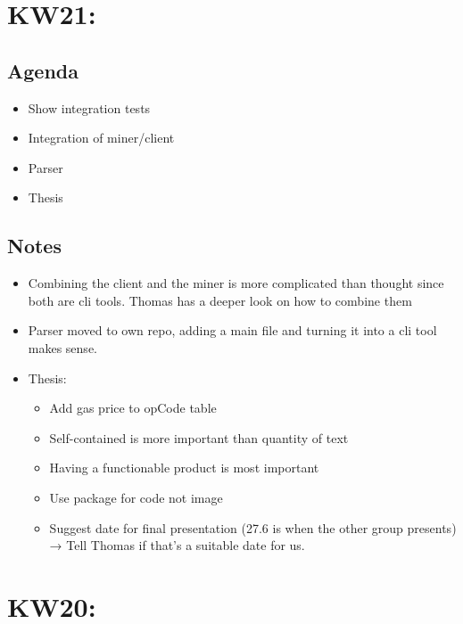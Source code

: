\section{KW21:}
\subsection{Agenda}
\begin{itemize}
\item
  Show integration tests
\item
  Integration of miner/client
\item
  Parser
\item
  Thesis
\end{itemize}

\subsection{Notes}
\begin{itemize}
\item
  Combining the client and the miner is more complicated than thought
  since both are cli tools. Thomas has a deeper look on how to combine
  them
\item
  Parser moved to own repo, adding a main file and turning it into a cli
  tool makes sense.
\item
  Thesis:
  \begin{itemize}
  \item
    Add gas price to opCode table
  \item
    Self-contained is more important than quantity of text
  \item
    Having a functionable product is most important
  \item
    Use package for code not image
  \item
    Suggest date for final presentation (27.6 is when the other group
    presents) → Tell Thomas if that's a suitable date for us.
  \end{itemize}
\end{itemize}

\section{KW20:}
